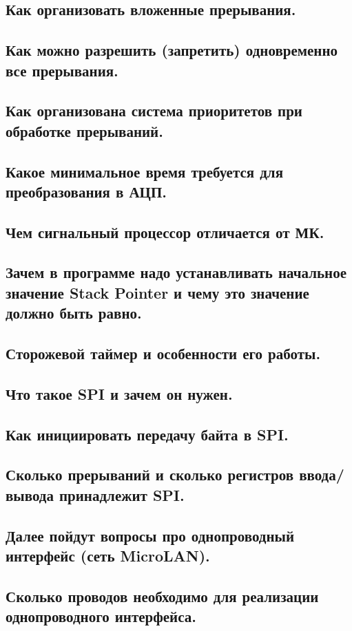 \subsection{Как организовать вложенные прерывания.}
\subsection{Как можно разрешить (запретить) одновременно все прерывания.}
\subsection{Как организована система приоритетов при обработке прерываний. }
\subsection{Какое минимальное время требуется для преобразования в АЦП.}
\subsection{Чем сигнальный процессор отличается от МК.}
\subsection{Зачем в программе надо устанавливать начальное значение Stack Pointer и чему это значение должно быть равно.}
\subsection{Сторожевой таймер и особенности его работы.}
\subsection{Что такое SPI и зачем он нужен.}
\subsection{Как инициировать передачу байта в SPI.}
\subsection{Сколько прерываний и сколько регистров ввода/вывода принадлежит SPI.}
\subsection{Далее пойдут вопросы про однопроводный интерфейс (сеть MicroLAN).}
\subsection{Сколько проводов необходимо для реализации однопроводного интерфейса.}
